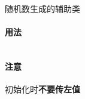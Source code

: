 随机数生成的辅助类

\paragraph{用法}

\inputminted{cpp}{src/src/rand_gen_eg.cpp}

\paragraph{注意}

初始化时\textbf{不要传左值}
